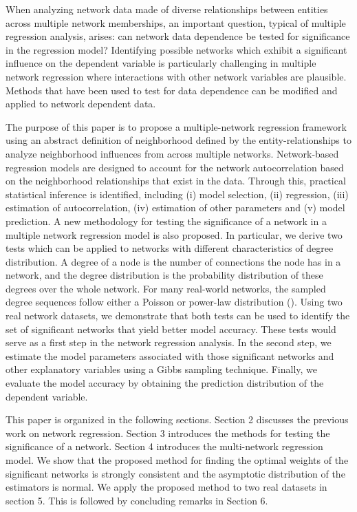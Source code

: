 \documentclass[times, doublespace]{auth}
\begin{document}
When analyzing network data made of diverse relationships between entities across multiple network memberships, an important question, typical of multiple regression analysis, arises: can network data dependence be tested for significance in the regression model? Identifying possible networks which exhibit a significant influence on the dependent variable is particularly challenging in multiple network regression where interactions with other network variables are plausible. Methods that have been used to test for data dependence can be modified and applied to network dependent data. 
\newline

The purpose of this paper is to propose a multiple-network regression framework using an abstract definition of neighborhood defined by the entity-relationships to analyze neighborhood influences from across multiple networks. Network-based regression models are designed to account for the network autocorrelation based on the neighborhood relationships that exist in the data. Through this, practical statistical inference is identified, including (i) model selection, (ii) regression, (iii) estimation of autocorrelation, (iv) estimation of other parameters and (v) model prediction. A new methodology for testing the significance of a network in a multiple network regression model is also proposed. In particular, we derive two tests which can be applied to networks with different characteristics of degree distribution. A degree of a node is the number of connections the node has in a network, and the degree distribution is the probability distribution of these degrees over the whole network. For many real-world networks, the sampled degree sequences follow either a Poisson or power-law distribution (\cite{R30}). Using two real network datasets, we demonstrate that both tests can be used to identify the set of significant networks that yield better model accuracy. These tests would serve as a first step in the network regression analysis. In the second step, we estimate the model parameters associated with those significant networks and other explanatory variables using a Gibbs sampling technique. Finally, we evaluate the model accuracy by obtaining the prediction distribution of the dependent variable.     

\vspace{\baselineskip}

This paper is organized in the following sections. Section 2 discusses the previous work on network regression. Section 3 introduces the methods for testing the significance of a network. Section 4 introduces the multi-network regression model. We show that the proposed method for finding the optimal weights of the significant networks is strongly consistent and the asymptotic distribution of the estimators is normal. We apply the proposed method to two real datasets in section 5. This is followed by concluding remarks in Section 6.
\end{document}
